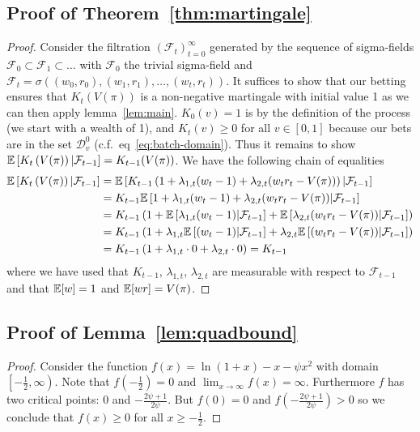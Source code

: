 \subsection{Proof of Theorem~\ref{thm:martingale}}
\begin{proof}
Consider the filtration $(\mathcal{F}_t)_{t=0}^{\infty}$ generated
by the sequence of sigma-fields 
$\mathcal{F}_0 \subset \mathcal{F}_1 \subset \ldots$ 
with $\mathcal{F}_0$ the trivial sigma-field and 
$\mathcal{F}_t = \sigma((w_0,r_0),(w_1,r_1),\ldots,(w_t,r_t))$.
It suffices to show that our betting ensures that $K_t(V(\pi))$
is a non-negative martingale with initial value 1
as we can then apply lemma~\ref{lem:main}. $K_0(v)=1$ is by 
the definition of the process (we start with a wealth of 1),
and $K_t(v)\geq 0$ for all $v \in [0,1]$ because our bets 
are in the set $\mathcal{D}_v^0$ (c.f.\ eq~\eqref{eq:batch-domain}). 
Thus it remains to show
$\mathbb{E}\left[K_t\left(V(\pi)\right)|\mathcal{F}_{t-1}\right]=K_{t-1}(V(\pi))$.
We have the following chain of equalities
\begin{align*}
    \mathbb{E}\left[K_t\left(V(\pi)\right)|\mathcal{F}_{t-1}\right]&=
    \mathbb{E}\left[K_{t-1}\left(1+\lambda_{1,t}(w_t-1)+\lambda_{2,t}(w_t r_t -V(\pi))\right)|\mathcal{F}_{t-1}\right]\\
    &=K_{t-1} \mathbb{E}\left[1+\lambda_{1,t}(w_t-1)+\lambda_{2,t}(w_t r_t -V(\pi))|\mathcal{F}_{t-1}\right]\\
    &=K_{t-1} \left(1+\mathbb{E}\left[\lambda_{1,t}(w_t-1)|\mathcal{F}_{t-1}\right]+
    \mathbb{E}\left[\lambda_{2,t}(w_t r_t -V(\pi))|\mathcal{F}_{t-1}\right]\right)\\
    &=K_{t-1} \left(1+\lambda_{1,t}\mathbb{E}\left[(w_t-1)|\mathcal{F}_{t-1}\right]+
    \lambda_{2,t}\mathbb{E}\left[(w_t r_t -V(\pi))|\mathcal{F}_{t-1}\right]\right)\\
    &=K_{t-1} \left(1+\lambda_{1,t}\cdot 0 + \lambda_{2,t} \cdot 0\right) = K_{t-1}
\end{align*}
where we have used that $K_{t-1}$, $\lambda_{1,t}$, $\lambda_{2,t}$
are measurable with respect to $\mathcal{F}_{t-1}$ and that $\mathbb{E}[w]=1$ and 
$\mathbb{E}[wr]=V(\pi)$.
\end{proof}

\subsection{Proof of Lemma~\ref{lem:quadbound}}
\begin{proof}
Consider the function $f(x) = \ln(1+x)- x - \psi x^2$ with domain $\left[-\frac{1}{2},\infty\right)$. Note that $f\left(-\frac{1}{2}\right)=0$
and $\lim_{x\to\infty} f(x) = \infty$.
Furthermore $f$ has two critical points: $0$ and $-\frac{2\psi + 1}{2\psi}$. 
But $f(0)=0$ and $f\left(-\frac{2\psi + 1}{2\psi}\right)>0$ so we conclude 
that $f(x)\geq 0$ for all $x\geq -\frac{1}{2}$.
\end{proof}

